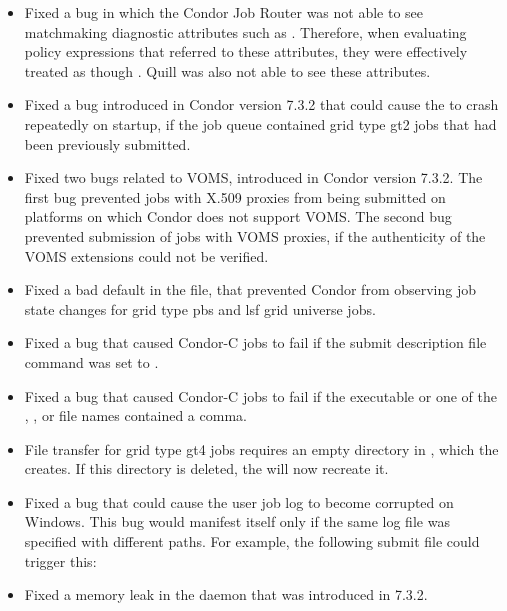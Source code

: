 \begin{itemize}
\item Fixed a bug in which the Condor Job Router was not able
to see matchmaking diagnostic attributes such as .
Therefore, when evaluating policy
expressions that referred to these attributes, they were effectively
treated as though .
Quill was also not able to see these attributes.

\item Fixed a bug introduced in Condor version 7.3.2 that could cause the
 to crash repeatedly on startup,
if the job queue
contained grid type gt2 jobs that had been previously submitted.

\item Fixed two bugs related to VOMS, introduced in Condor version 7.3.2.
The first bug
prevented jobs with X.509 proxies from being submitted on platforms
on which Condor does not support VOMS.
The second bug prevented submission
of jobs with VOMS proxies, if the authenticity of the VOMS extensions
could not be verified.

\item Fixed a bad default in the  file,
that prevented
Condor from observing job state changes for grid type pbs and lsf grid
universe jobs.

\item Fixed a bug that caused Condor-C jobs to fail if
the submit description file command 
was set to .

\item Fixed a bug that caused Condor-C jobs to fail if the executable
or one of the , , or  file names
contained a comma.

\item File transfer for grid type gt4 jobs requires an empty directory
in , which the  creates. If this directory
is deleted, the  will now recreate it.

\item Fixed a bug that could cause the user job log to become
  corrupted on Windows.  This bug would manifest itself only if the
  same log file was specified with different paths.  For example, the
  following submit file could trigger this:

\item Fixed a memory leak in the  daemon that was introduced
in 7.3.2.


\end{itemize}
